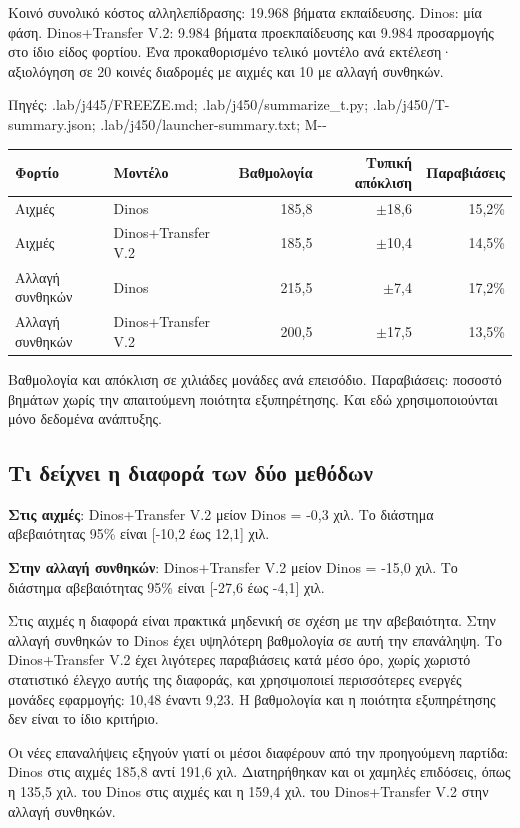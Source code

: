\documentclass[10pt,a4paper]{article}
\newcommand{\src}[1]{\par{\scriptsize\color{gray}Πηγές: {\ttfamily #1}}\par}
\begin{document}
Κοινό συνολικό κόστος αλληλεπίδρασης: 19.968 βήματα εκπαίδευσης. Dinos: μία φάση. Dinos+Transfer V.2: 9.984 βήματα προεκπαίδευσης και 9.984 προσαρμογής στο ίδιο είδος φορτίου. Ένα προκαθορισμένο τελικό μοντέλο ανά εκτέλεση· αξιολόγηση σε 20 κοινές διαδρομές με αιχμές και 10 με αλλαγή συνθηκών.
\src{.lab/\allowbreak j445/\allowbreak FREEZE.md; .lab/\allowbreak j450/\allowbreak summarize\_t.py; .lab/\allowbreak j450/\allowbreak T-\allowbreak summary.json; .lab/\allowbreak j450/\allowbreak launcher-\allowbreak summary.txt; M-\allowbreak 20261110-\allowbreak 017}
\begin{center}\begin{tabular}{llrrr}\toprule
Φορτίο & Μοντέλο & Βαθμολογία & Τυπική απόκλιση & Παραβιάσεις\\\midrule
Αιχμές & Dinos & 185,8 & $\pm$18,6 & 15,2\% \\
Αιχμές & Dinos+Transfer V.2 & 185,5 & $\pm$10,4 & 14,5\% \\
Αλλαγή συνθηκών & Dinos & 215,5 & $\pm$7,4 & 17,2\% \\
Αλλαγή συνθηκών & Dinos+Transfer V.2 & 200,5 & $\pm$17,5 & 13,5\% \\
\bottomrule\end{tabular}\end{center}
Βαθμολογία και απόκλιση σε χιλιάδες μονάδες ανά επεισόδιο. Παραβιάσεις: ποσοστό βημάτων χωρίς την απαιτούμενη ποιότητα εξυπηρέτησης. Και εδώ χρησιμοποιούνται μόνο δεδομένα ανάπτυξης.
\subsection*{Τι δείχνει η διαφορά των δύο μεθόδων}
\textbf{Στις αιχμές}: Dinos+Transfer V.2 μείον Dinos = -0,3 χιλ. Το διάστημα αβεβαιότητας 95\% είναι [-10,2 έως 12,1] χιλ.

\textbf{Στην αλλαγή συνθηκών}: Dinos+Transfer V.2 μείον Dinos = -15,0 χιλ. Το διάστημα αβεβαιότητας 95\% είναι [-27,6 έως -4,1] χιλ.

Στις αιχμές η διαφορά είναι πρακτικά μηδενική σε σχέση με την αβεβαιότητα. Στην αλλαγή συνθηκών το Dinos έχει υψηλότερη βαθμολογία σε αυτή την επανάληψη. Το Dinos+Transfer V.2 έχει λιγότερες παραβιάσεις κατά μέσο όρο, χωρίς χωριστό στατιστικό έλεγχο αυτής της διαφοράς, και χρησιμοποιεί περισσότερες ενεργές μονάδες εφαρμογής: 10,48 έναντι 9,23. Η βαθμολογία και η ποιότητα εξυπηρέτησης δεν είναι το ίδιο κριτήριο.

Οι νέες επαναλήψεις εξηγούν γιατί οι μέσοι διαφέρουν από την προηγούμενη παρτίδα: Dinos στις αιχμές 185,8 αντί 191,6 χιλ. Διατηρήθηκαν και οι χαμηλές επιδόσεις, όπως η 135,5 χιλ. του Dinos στις αιχμές και η 159,4 χιλ. του Dinos+Transfer V.2 στην αλλαγή συνθηκών.
\end{document}
